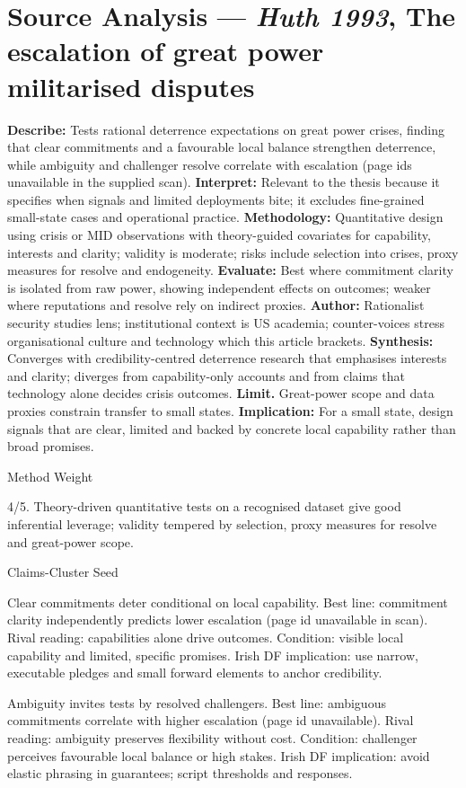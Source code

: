 \section*{Source Analysis — \textit{Huth 1993}, The escalation of great power militarised disputes}
\textbf{Describe:} Tests rational deterrence expectations on great power crises, finding that clear commitments and a favourable local balance strengthen deterrence, while ambiguity and challenger resolve correlate with escalation (page ids unavailable in the supplied scan).
\textbf{Interpret:} Relevant to the thesis because it specifies when signals and limited deployments bite; it excludes fine-grained small-state cases and operational practice.
\textbf{Methodology:} Quantitative design using crisis or MID observations with theory-guided covariates for capability, interests and clarity; validity is moderate; risks include selection into crises, proxy measures for resolve and endogeneity.
\textbf{Evaluate:} Best where commitment clarity is isolated from raw power, showing independent effects on outcomes; weaker where reputations and resolve rely on indirect proxies.
\textbf{Author:} Rationalist security studies lens; institutional context is US academia; counter-voices stress organisational culture and technology which this article brackets.
\textbf{Synthesis:} Converges with credibility-centred deterrence research that emphasises interests and clarity; diverges from capability-only accounts and from claims that technology alone decides crisis outcomes.
\textbf{Limit.} Great-power scope and data proxies constrain transfer to small states.
\textbf{Implication:} For a small state, design signals that are clear, limited and backed by concrete local capability rather than broad promises.

Method Weight

4/5. Theory-driven quantitative tests on a recognised dataset give good inferential leverage; validity tempered by selection, proxy measures for resolve and great-power scope.

Claims-Cluster Seed

Clear commitments deter conditional on local capability.
Best line: commitment clarity independently predicts lower escalation (page id unavailable in scan).
Rival reading: capabilities alone drive outcomes.
Condition: visible local capability and limited, specific promises.
Irish DF implication: use narrow, executable pledges and small forward elements to anchor credibility.

Ambiguity invites tests by resolved challengers.
Best line: ambiguous commitments correlate with higher escalation (page id unavailable).
Rival reading: ambiguity preserves flexibility without cost.
Condition: challenger perceives favourable local balance or high stakes.
Irish DF implication: avoid elastic phrasing in guarantees; script thresholds and responses.

